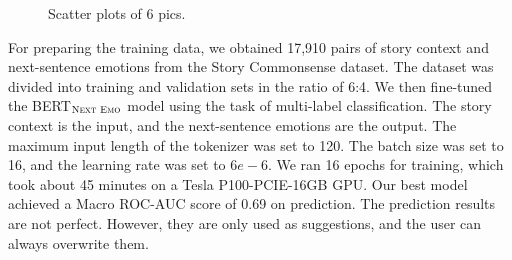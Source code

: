 \documentclass{article} %
\begin{document}
\begin{figure}[h]
    \hspace*{\fill}
    \hspace*{\fill}
    
    \hspace*{\fill}
    \hspace*{\fill}
    \caption{Scatter plots of 6 pics.}\label{fig:Scatter}
\end{figure}


For preparing the training data, we obtained 17,910 pairs of story context and next-sentence emotions from the Story Commonsense dataset. The dataset was divided into training and validation sets in the ratio of 6:4. We then fine-tuned the BERT$_{\textsc{Next Emo}}$ model %
using the task of multi-label classification. The story context is the input, and the next-sentence emotions are the output. The maximum input length of the tokenizer was set to 120. The batch size was set to 16, and the learning rate was set to $6e-6$. We ran 16 epochs for training, which took about 45 minutes on a Tesla P100-PCIE-16GB GPU. Our best model achieved a Macro ROC-AUC score of 0.69 on prediction. The prediction results are not perfect. However, they are only used as suggestions, and the user can always overwrite them. 
\end{document}
